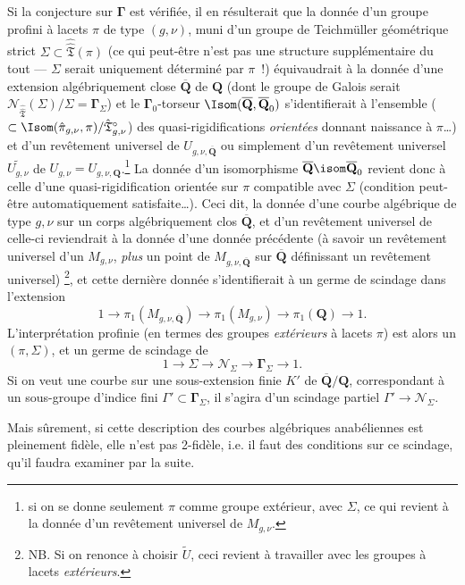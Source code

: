 Si la conjecture sur $\boldsymbol{\Gamma}$ est vérifiée, il en résulterait que la donnée d'un groupe profini à lacets $\pi$ de type $(g,\nu)$, muni d'un groupe de Teichmüller géométrique strict $\Sigma\subset \hat{\hat{\mathfrak{T}}}(\pi)$ (ce qui peut-être n'est pas une structure supplémentaire du tout --- $\Sigma$ serait uniquement déterminé par $\pi$~!) équivaudrait à la donnée d'une extension algébriquement close $\overline{\mathbf{Q}}$ de $\mathbf{Q}$ (dont le groupe de Galois serait $\mathcal{N}_{{\hat{\hat{\mathfrak{T}}}}} (\Sigma)/\Sigma=\boldsymbol{\Gamma}_\Sigma$) et le $\boldsymbol{\Gamma}_0$-torseur ${\Isom} (\overline{\mathbf{Q}},\overline{\mathbf{Q}}_0)$ s'identifierait à l'ensemble ($\subset {\Isom}(\hat{\pi}_{g,\nu},\pi)/\hat{\mathfrak{T}}^\circ_{g,\nu}$) des quasi-rigidifications \emph{orientées} donnant naissance à $\pi$\dots) et d'un revêtement universel de $U_{g,\nu,\overline{\mathbf{Q}}}$ ou simplement d'un revêtement universel $\widetilde{U_{g,\nu}}$ de $U_{g,\nu}=U_{g,\nu,\mathbf{Q}}$.\footnote{si on se donne seulement $\pi$ comme groupe extérieur, avec $\Sigma$, ce qui revient à la donnée d'un revêtement universel de $M_{g,\nu}$.} La donnée d'un isomorphisme $\overline{\mathbf{Q}} \isom \overline{\mathbf{Q}}_0$ revient donc à celle d'une quasi-rigidification orientée sur $\pi$ compatible avec $\Sigma$ (condition peut-être automatiquement satisfaite\dots). Ceci dit, la donnée d'une courbe algébrique de type $g,\nu$ sur un corps algébriquement clos $\overline{\mathbf{Q}}$, et d'un revêtement universel de celle-ci reviendrait à la donnée d'une donnée précédente (à savoir un revêtement universel d'un $M_{g,\nu}$, \emph{plus} un point de $M_{g,\nu,\overline{\mathbf{Q}}}$ sur $\overline{\mathbf{Q}}$ définissant un revêtement universel) \footnote{NB. Si on renonce à choisir $\widetilde{U}$, ceci revient à travailler avec les groupes à lacets \emph{extérieurs}.}, et cette dernière donnée s'identifierait à un germe de scindage dans l'extension
$$
1\to\pi_1(M_{g,\nu,\overline{\mathbf{Q}}})\to \pi_1(M_{g,\nu})\to\pi_1(\mathbf{Q})\to 1.
$$
L'interprétation profinie (en termes des groupes \emph{extérieurs} à lacets $\pi$) est alors un $(\pi,\Sigma)$, et un germe de scindage de  
$$
1\to\Sigma\to\mathcal{N}_\Sigma\to\boldsymbol{\Gamma}_\Sigma\to 1.
$$
Si on veut une courbe sur une sous-extension finie $K'$ de $\overline{\mathbf{Q}}/\mathbf{Q}$, correspondant à un sous-groupe d'indice fini $\Gamma'\subset \boldsymbol{\Gamma}_\Sigma$, il s'agira d'un scindage partiel $\Gamma'\to\mathcal{N}_\Sigma$.

Mais sûrement, si cette description des courbes algébriques anabéliennes est pleinement fidèle, elle n'est pas 2-fidèle, i.e. il faut des conditions sur ce scindage, qu'il faudra examiner par la suite. 

